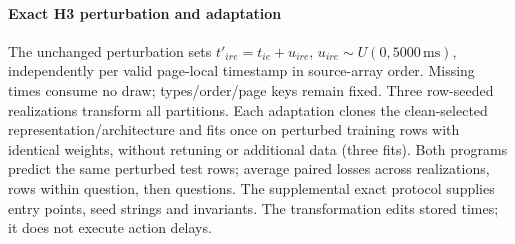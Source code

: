

\paragraph{Exact H3 perturbation and adaptation}
The unchanged perturbation sets $t'_{ire}=t_{ie}+u_{ire}$, $u_{ire}\sim U(0,5000\,\mathrm{ms})$, independently per valid page-local timestamp in source-array order. Missing times consume no draw; types/order/page keys remain fixed. Three row-seeded realizations transform all partitions. Each adaptation clones the clean-selected representation/architecture and fits once on perturbed training rows with identical weights, without retuning or additional data (three fits). Both programs predict the same perturbed test rows; average paired losses across realizations, rows within question, then questions. The supplemental exact protocol supplies entry points, seed strings and invariants. The transformation edits stored times; it does not execute action delays.
